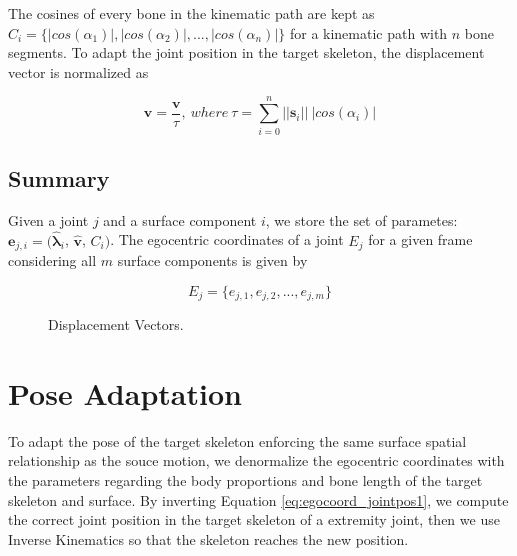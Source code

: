 \documentclass{vgtc}
\begin{document}
The cosines of every bone in the kinematic path are kept as
\(C_{i} = \{|cos(\alpha_{1})|, |cos(\alpha_{2})|,..., |cos(\alpha_{n})|\}\)
for a kinematic path with \(n\) bone segments. To adapt the joint
position in the target skeleton, the displacement vector is normalized
as

\begin{equation}
\label{eq:tau}
\mathbf{\hat{v}} = \frac{\mathbf{v}}{\tau},\ where\ \tau = \sum_{i=0}^{n}||\mathbf{s}_{i}||\ |cos(\alpha_{i})|
\end{equation}

\subsection{Summary}\label{summary}

Given a joint \(j\) and a surface component \(i\), we store the set of
parametes: \(\mathbf{e}_{j,i} = (\mathbf{\hat{\lambda}}_{i}\),
\(\mathbf{\hat{v}}\), \(C_{i})\). The egocentric coordinates of a joint
\(E_{j}\) for a given frame considering all \(m\) surface components is
given by

\begin{equation}
\label{eq:egocoordsall}
E_{j} = \{e_{j,1}, e_{j,2},...,e_{j,m}\}
\end{equation}



    \captionsetup{labelformat=default}
    \begin{figure}
        \begin{center}\end{center}
        \caption{Displacement Vectors.}
        \label{fig:dispvectors}
    \end{figure}

    \section{Pose Adaptation}\label{pose-adaptation}

To adapt the pose of the target skeleton enforcing the same surface
spatial relationship as the souce motion, we denormalize the egocentric
coordinates with the parameters regarding the body proportions and bone
length of the target skeleton and surface. By inverting Equation
\ref{eq:egocoord_jointpos1}, we compute the correct joint position in
the target skeleton of a extremity joint, then we use Inverse Kinematics
so that the skeleton reaches the new position.
\end{document}
